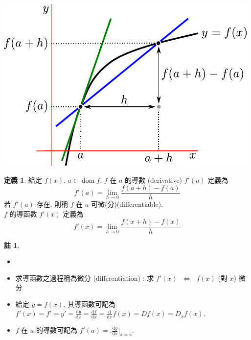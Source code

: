 \documentclass[12pt,a4paper]{extarticle}
\newcommand{\ds}{\displaystyle}
\newcommand{\ifff}{\;\Longleftrightarrow\;}
\DeclareMathOperator*{\dom}{dom}
\theoremstyle{definition}
\newtheorem*{dfn}{定義}
\newtheorem*{rmk}{註}
\begin{document}
\begin{minipage}{0.4\textwidth}
  \includegraphics[scale=0.8,page=1]{fig/tangentA.pdf}
\end{minipage}
\quad
\begin{minipage}{0.6\textwidth}
  \begin{dfn}
    給定 $f(x)$, $a\in\dom f$. $f$ 在 $a$ 的導數 (derivative) $f'(a)$ 定義為 $$f'(a) = \lim_{h\to 0}\frac{f(a + h) - f(a)}{h}$$ 若 $f'(a)$ 存在, 則稱 $f$ 在 $a$ 可微(分)(differentiable). \\  
    $f$ 的導函數 $f'(x)$ 定義為 $$f'(x) = \lim_{h\to 0}\frac{f(x + h) - f(x)}{h}$$ 
  \end{dfn}
\end{minipage}

\begin{rmk}
  \begin{itemize}\setlength\itemsep{0em}
    \item[]
    \item 求導函數之過程稱為微分 (differentiation) : 求 $f'(x)$ $\ifff$ $f(x)$ (對 $x$) 微分
    \item 給定 $y = f(x)$, 其導函數可記為 $\ds f'(x) = f' = y' = \frac{\text{d}y}{\text{d}x} = \frac{\text{d}f}{\text{d}x} = \frac{\text{d}}{\text{d}x} f(x) = Df(x) = D_x f(x)$. 
    \item $f$ 在 $a$ 的導數可記為 $\ds f'(a) = \Big.\frac{\text{d}y}{\text{d}x}\Big|_{x = a}$.  
  \end{itemize}
\end{rmk}
\end{document}
